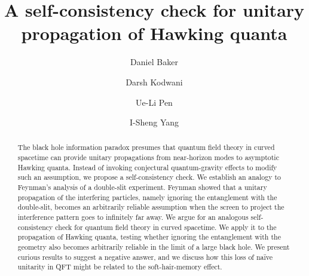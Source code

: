 \documentclass[aps,showpacs,onecolumn,floats,prd,superscriptaddress,nofootinbib]{revtex4-1}
\begin{document}
\title{A self-consistency check for unitary propagation of Hawking quanta}

\author{Daniel Baker}

\author{Darsh Kodwani}

\author{Ue-Li Pen}

\author{I-Sheng Yang}


\begin{abstract}
The black hole information paradox presumes that quantum field theory in curved spacetime can provide unitary propagations from near-horizon modes to asymptotic Hawking quanta. 
Instead of invoking conjectural quantum-gravity effects to modify such an assumption, we propose a self-consistency check.
We establish an analogy to Feynman's analysis of a double-slit experiment. 
Feynman showed that a unitary propagation of the interfering particles, namely ignoring the entanglement with the double-slit, becomes an arbitrarily reliable assumption when the screen to project the interference pattern goes to infinitely far away.
We argue for an analogous self-consistency check for quantum field theory in curved spacetime.
We apply it to the propagation of Hawking quanta, testing whether ignoring the entanglement with the geometry also becomes arbitrarily reliable in the limit of a large black hole. 
We present curious results to suggest a negative answer, and we discuss how this loss of na\"ive unitarity in QFT might be related to the soft-hair-memory effect.
\end{abstract}
\end{document}
